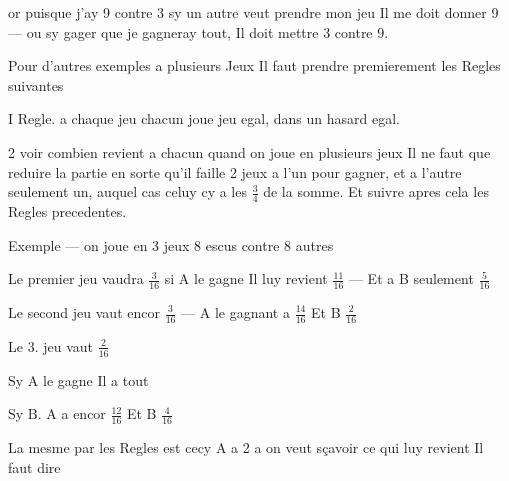 \documentclass[11pt,a4paper]{article}
\begin{document}
or puisque j'ay 9 contre 3 sy un autre veut prendre mon jeu Il me doit donner 9 --- ou sy 
 gager que je gagneray tout, Il doit mettre 3 contre 9.

Pour d'autres exemples a plusieurs Jeux Il faut prendre premierement les Regles suivantes

I Regle. a chaque jeu chacun joue jeu egal, dans un hasard egal.

2   voir combien revient a chacun quand on joue en plusieurs jeux
Il ne faut que reduire la partie en sorte qu'il faille 2 jeux a l'un pour
gagner, et a l'autre seulement un, auquel cas celuy cy a les $\frac{3}{4}$ de la
somme. Et suivre apres cela les Regles precedentes.

Exemple --- on joue en 3 jeux 8 escus contre 8 autres

Le premier jeu vaudra $\frac{3}{16}$ si A le gagne Il luy revient $\frac{11}{16}$ --- Et a B seulement $\frac{5}{16}$

Le second jeu vaut encor $\frac{3}{16}$ --- A le gagnant a $\frac{14}{16}$ Et B $\frac{2}{16}$

Le 3. jeu vaut $\frac{2}{16}$

Sy A le gagne Il a tout

Sy B. A a encor $\frac{12}{16}$ Et B $\frac{4}{16}$

La mesme par les Regles est cecy
\ill{} A a 2 \ill{} a \ill{} on veut sçavoir ce qui luy revient \ill{} Il faut dire \ill{}
\end{document}
